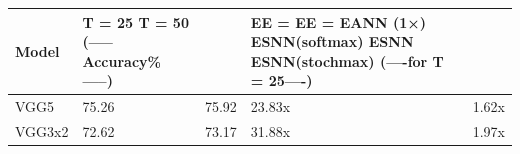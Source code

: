 \begin{tabular}{lllll}
\toprule
Model & T = 25 T = 50 (—–Accuracy\%—–) &  & EE = EE = EANN (1×) ESNN(softmax) ESNN ESNN(stochmax) (—-for T = 25—-) &  \\
\midrule
VGG5 & 75.26 & 75.92 & 23.83x & 1.62x \\
VGG3x2 & 72.62 & 73.17 & 31.88x & 1.97x \\
\bottomrule
\end{tabular}
